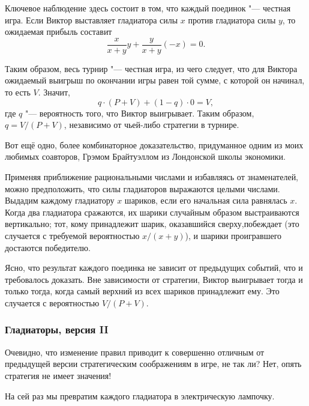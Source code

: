 \documentclass[twoside]{book}
\begin{document}
Ключевое наблюдение здесь состоит в том, что каждый поединок "--- честная игра.
Если Виктор выставляет гладиатора силы $x$ против гладиатора силы $y$, то ожидаемая прибыль составит 
\[\frac{x}{x+y}y + \frac{y}{x+y}(-x) =0.\]

Таким образом, весь турнир "--- честная игра, из чего следует, что для Виктора ожидаемый выигрыш по окончании игры равен той сумме, с которой он начинал, то есть $V$. %
Значит,
\[q\cdot(P + V) + (1-q)\cdot0 = V,\]
где $q$ "--- вероятность того, что Виктор выигрывает.
Таким образом, $q = V/(P+V)$,
независимо от чьей-либо стратегии в турнире.
\heart

\medskip
Вот ещё одно, более комбинаторное доказательство, придуманное одним из моих любимых соавторов, Грэмом Брайтуэллом из Лондонской школы экономики. %

Применяя приближение рациональными числами и избавляясь от знаменателей, можно предположить, что силы гладиаторов выражаются целыми числами.
Выдадим каждому гладиатору $x$ шариков, если его начальная сила равнялась $x$.
Когда два гладиатора сражаются, их шарики случайным образом
выстраиваются вертикально; тот, кому принадлежит шарик, оказавшийся сверху,побеждает (это случается с требуемой вероятностью $x/(x+y)$), и шарики проигравшего достаются победителю.

Ясно, что результат каждого поединка не зависит от предыдущих событий, что и требовалось доказать.
Вне зависимости от стратегии, Виктор выигрывает тогда и только тогда, когда самый верхний из всех шариков принадлежит ему.
Это случается с вероятностью $V/(P+V)$.

\subsubsection*{Гладиаторы, версия II}%

Очевидно, что изменение правил приводит к совершенно отличным от
предыдущей версии стратегическим соображениям в игре, не так ли? Нет,
опять стратегия не имеет значения!

\medskip

На сей раз мы превратим каждого гладиатора
в электрическую лампочку.
\end{document}
